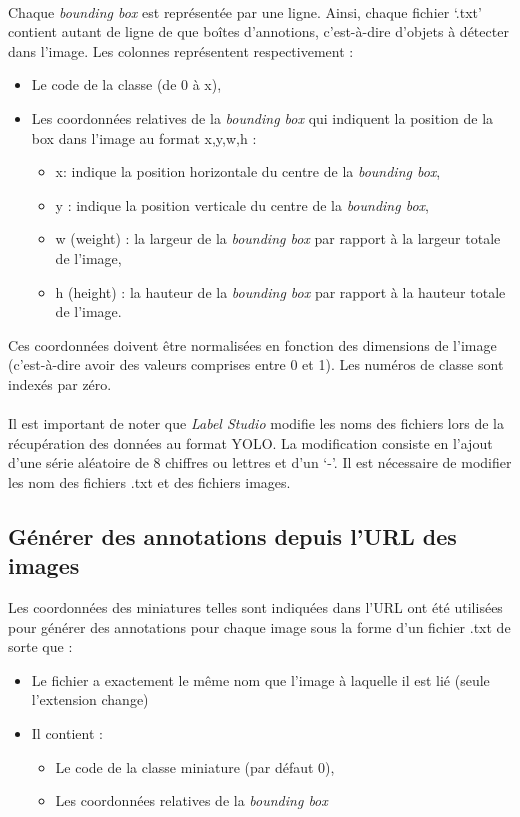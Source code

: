 \documentclass[12pt,twoside]{book}
\begin{document}
\paragraph{}
Chaque \textit{bounding box} est représentée par une ligne. Ainsi, chaque fichier ‘.txt’ contient autant de ligne de que boîtes d’annotions, c’est-à-dire d’objets à détecter dans l’image. Les colonnes représentent respectivement :
\begin{itemize}
    \item Le code de la classe (de 0 à x),
    \item Les coordonnées relatives de la \textit{bounding box} qui indiquent la position de la box dans l'image au format x,y,w,h :
    \begin{itemize}
        \item x: indique la position horizontale du centre de la \textit{bounding box},
        \item y : indique la position verticale du centre de la \textit{bounding box},
        \item w (weight) : la largeur de la \textit{bounding box} par rapport à la largeur totale de l'image,
        \item h (height) : la hauteur de la \textit{bounding box} par rapport à la hauteur totale de l'image.
    \end{itemize}
\end{itemize}

Ces coordonnées doivent être normalisées en fonction des dimensions de l'image (c'est-à-dire avoir des valeurs comprises entre 0 et 1). Les numéros de classe sont indexés par zéro.

\paragraph{}
Il est important de noter que \textit{Label Studio} modifie les noms des fichiers lors de la récupération des données au format YOLO. La modification consiste en l’ajout d’une série aléatoire de 8 chiffres ou lettres et d’un ‘-’. Il est nécessaire de modifier les nom des fichiers .txt et des fichiers images.

\newpage
\subsection{Générer des annotations depuis l'URL des images}

Les coordonnées des miniatures telles sont indiquées dans l’URL ont été utilisées pour générer des annotations pour chaque image sous la forme d’un fichier .txt de sorte que :
\begin{itemize}
    \item Le fichier a exactement le même nom que l’image à laquelle il est lié (seule l’extension change)
    \item Il contient :
    \begin{itemize}
        \item Le code de la classe miniature (par défaut 0),
        \item Les coordonnées relatives de la \textit{bounding box}
    \end{itemize}
\end{itemize}
\end{document}
